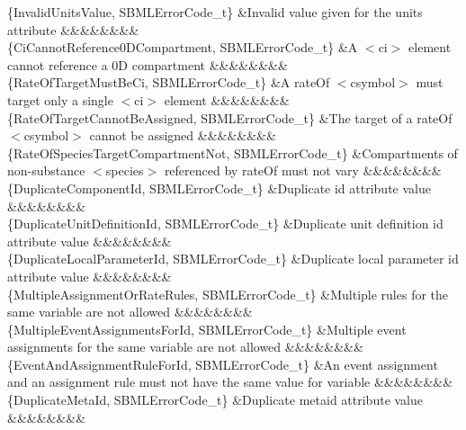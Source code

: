 \begin{DoxyParagraph}{}
\begin{longtabu}
\{Invalid\+Units\+Value, S\+B\+M\+L\+Error\+Code\+\_\+t\} &Invalid value given for the \textquotesingle{}units\textquotesingle{} attribute &&&&&&&&\\
\{Ci\+Cannot\+Reference0\+D\+Compartment, S\+B\+M\+L\+Error\+Code\+\_\+t\} &A {\ttfamily $<$ci$>$} element cannot reference a 0D compartment &&&&&&&&\\
\{Rate\+Of\+Target\+Must\+Be\+Ci, S\+B\+M\+L\+Error\+Code\+\_\+t\} &A \textquotesingle{}rate\+Of\textquotesingle{} {\ttfamily $<$csymbol$>$} must target only a single {\ttfamily $<$ci$>$} element &&&&&&&&\\
\{Rate\+Of\+Target\+Cannot\+Be\+Assigned, S\+B\+M\+L\+Error\+Code\+\_\+t\} &The target of a \textquotesingle{}rate\+Of\textquotesingle{} {\ttfamily $<$csymbol$>$} cannot be assigned &&&&&&&&\\
\{Rate\+Of\+Species\+Target\+Compartment\+Not, S\+B\+M\+L\+Error\+Code\+\_\+t\} &Compartments of non-\/substance {\ttfamily $<$species$>$} referenced by \textquotesingle{}rate\+Of\textquotesingle{} must not vary &&&&&&&&\\
\{Duplicate\+Component\+Id, S\+B\+M\+L\+Error\+Code\+\_\+t\} &Duplicate \textquotesingle{}id\textquotesingle{} attribute value &&&&&&&&\\
\{Duplicate\+Unit\+Definition\+Id, S\+B\+M\+L\+Error\+Code\+\_\+t\} &Duplicate unit definition \textquotesingle{}id\textquotesingle{} attribute value &&&&&&&&\\
\{Duplicate\+Local\+Parameter\+Id, S\+B\+M\+L\+Error\+Code\+\_\+t\} &Duplicate local parameter \textquotesingle{}id\textquotesingle{} attribute value &&&&&&&&\\
\{Multiple\+Assignment\+Or\+Rate\+Rules, S\+B\+M\+L\+Error\+Code\+\_\+t\} &Multiple rules for the same variable are not allowed &&&&&&&&\\
\{Multiple\+Event\+Assignments\+For\+Id, S\+B\+M\+L\+Error\+Code\+\_\+t\} &Multiple event assignments for the same variable are not allowed &&&&&&&&\\
\{Event\+And\+Assignment\+Rule\+For\+Id, S\+B\+M\+L\+Error\+Code\+\_\+t\} &An event assignment and an assignment rule must not have the same value for \textquotesingle{}variable\textquotesingle{} &&&&&&&&\\
\{Duplicate\+Meta\+Id, S\+B\+M\+L\+Error\+Code\+\_\+t\} &Duplicate \textquotesingle{}metaid\textquotesingle{} attribute value &&&&&&&&\\

\end{longtabu}
\end{DoxyParagraph}

